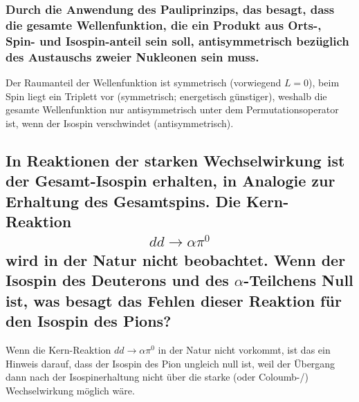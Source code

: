 \documentclass[ex, minted]{exercise_4.1}
\begin{document}
\subsubsection{Durch die Anwendung des Pauliprinzips, das besagt, dass die gesamte Wellenfunktion, die ein Produkt aus Orts-, Spin- und Isospin-anteil sein soll, antisymmetrisch bezüglich des Austauschs zweier
Nukleonen sein muss.}

\dottedlinett

Der Raumanteil der Wellenfunktion ist symmetrisch (vorwiegend \(L=0\)), beim Spin liegt ein Triplett vor (symmetrisch; energetisch günstiger), weshalb die gesamte Wellenfunktion nur antisymmetrisch unter dem Permutationsoperator ist, wenn der Isospin verschwindet (antisymmetrisch).

\subsection{In Reaktionen der starken Wechselwirkung ist der Gesamt-Isospin erhalten, in Analogie zur Erhaltung
des Gesamtspins. Die Kern-Reaktion
\begin{align*}
    dd \to \alpha \pi^0
\end{align*}
wird in der Natur nicht beobachtet. Wenn der Isospin des Deuterons und des \(\alpha\)-Teilchens Null ist, was besagt das Fehlen dieser Reaktion für den Isospin des Pions?}

\dottedlinett

Wenn die Kern-Reaktion \(dd \to \alpha \pi^0\) in der Natur nicht vorkommt, ist das ein Hinweis darauf, dass der Isospin des Pion ungleich null ist, weil der Übergang dann nach der Isospinerhaltung nicht über die starke (oder Coloumb-/) Wechselwirkung möglich wäre. 
\end{document}
